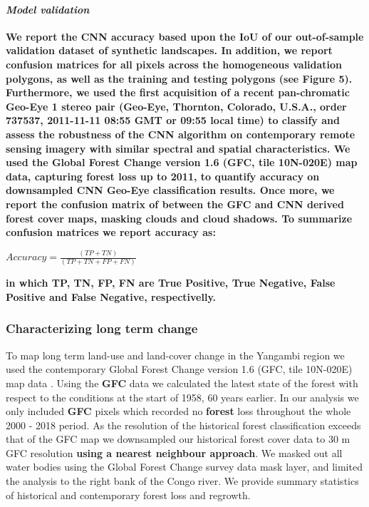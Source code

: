 \documentclass[remote sensing,article,submit,moreauthors,pdftex]{mdpi}
\begin{document}
\hypertarget{model-validation}{%
\paragraph{\texorpdfstring{\emph{Model
validation}}{Model validation}}\label{model-validation}}

\textbf{We report the CNN accuracy based upon the IoU of our
out-of-sample validation dataset of synthetic landscapes. In addition,
we report confusion matrices for all pixels across the homogeneous
validation polygons, as well as the training and testing polygons (see
Figure 5). Furthermore, we used the first acquisition of a recent
pan-chromatic Geo-Eye 1 stereo pair (Geo-Eye, Thornton, Colorado,
U.S.A., order 737537, 2011-11-11 08:55 GMT or 09:55 local time) to
classify and assess the robustness of the CNN algorithm on contemporary
remote sensing imagery with similar spectral and spatial
characteristics. We used the Global Forest Change version 1.6 (GFC, tile
10N-020E) \citep{hansen2013} map data, capturing forest loss up to 2011,
to quantify accuracy on downsampled CNN Geo-Eye classification results.
Once more, we report the confusion matrix of between the GFC and CNN
derived forest cover maps, masking clouds and cloud shadows. To
summarize confusion matrices we report accuracy as:}

\(Accuracy = \frac{(TP + TN)}{(TP + TN + FP + FN)}\)

\textbf{in which TP, TN, FP, FN are True Positive, True Negative, False
Positive and False Negative, respectivelly.}

\hypertarget{characterizing-long-term-change}{%
\subsubsection{Characterizing long term
change}\label{characterizing-long-term-change}}

To map long term land-use and land-cover change in the Yangambi region
we used the contemporary Global Forest Change version 1.6 (GFC, tile
10N-020E) map data \citep{hansen2013}. Using the \textbf{GFC} data we
calculated the latest state of the forest with respect to the conditions
at the start of 1958, 60 years earlier. In our analysis we only included
\textbf{GFC} pixels which recorded no \textbf{forest} loss throughout
the whole 2000 - 2018 period. As the resolution of the historical forest
classification exceeds that of the GFC map we downsampled our historical
forest cover data to 30 m GFC resolution \textbf{using a nearest
neighbour approach}. We masked out all water bodies using the Global
Forest Change survey data mask layer, and limited the analysis to the
right bank of the Congo river. We provide summary statistics of
historical and contemporary forest loss and regrowth.
\end{document}
